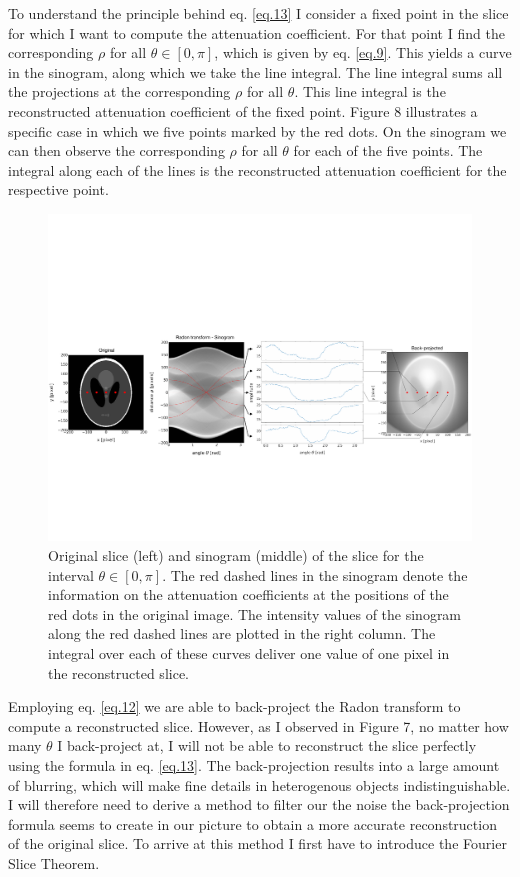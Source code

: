 \documentclass[12pt]{article}
\begin{document}
To understand the principle behind eq. \ref{eq.13} I consider a fixed point in the slice for which I want to compute the attenuation coefficient. For that point I find the corresponding $\rho$ for all $\theta \in [0,\pi]$, which is given by eq. \ref{eq.9}. This yields a curve in the sinogram, along which we take the line integral. The line integral sums all the projections at the corresponding $\rho$ for all $\theta$. This line integral is the reconstructed attenuation coefficient of the fixed point. Figure 8 illustrates a specific case in which we five points marked by the red dots. On the sinogram we can then observe the corresponding $\rho$ for all $\theta$ for each of the five points. The integral along each of the lines is the reconstructed attenuation coefficient for the respective point.
\begin{figure}[hbt]
	\includegraphics[width=1\textwidth]{inverse_radon/radon_transform.pdf}
	\caption{Original slice (left) and sinogram (middle) of the slice for the interval $\theta \in [0, \pi]$. The red dashed lines in the sinogram denote the information on the attenuation coefficients at the positions of the red dots in the original image. The intensity values of the sinogram along the red dashed lines are plotted in the right column. The integral over each of these curves deliver one value of one pixel in the reconstructed slice.}
\end{figure}

Employing eq. \ref{eq.12} we are able to back-project the Radon transform to compute a reconstructed slice. However, as I observed in Figure 7, no matter how many $\theta$ I back-project at, I will not be able to reconstruct the slice perfectly using the formula in eq. \ref{eq.13}. The back-projection results into a large amount of blurring, which will make fine details in heterogenous objects indistinguishable. I will therefore need to derive a method to filter our the noise the back-projection formula seems to create in our picture to obtain a more accurate reconstruction of the original slice. To arrive at this method I first have to introduce the Fourier Slice Theorem.
\end{document}
